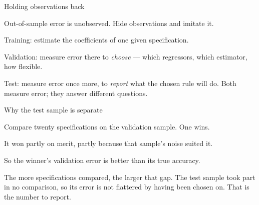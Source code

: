 \documentclass[aspectratio=169,11pt]{beamer}
\newenvironment{wideitemize}{\itemize\addtolength{\itemsep}{9pt}}{\enditemize}
\newcommand{\closingline}[1]{\vspace{0.9em}\noindent #1}
\begin{document}
\begin{frame}{Holding observations back}
\begin{center}
\end{center}
\vspace{0.3em}
\begin{wideitemize}
  \item Out-of-sample error is unobserved. Hide observations and imitate it.
  \item Training: estimate the coefficients of one given specification.
  \item Validation: measure error there to \emph{choose} --- which regressors,
        which estimator, how flexible.
  \item Test: measure error once more, to \emph{report} what the chosen rule
        will do.
\end{wideitemize}
\closingline{Both measure error; they answer different questions.}
\end{frame}

\begin{frame}{Why the test sample is separate}
\begin{wideitemize}
  \item Compare twenty specifications on the validation sample. One wins.
  \item It won partly on merit, partly because that sample's noise suited it.
  \item So the winner's validation error is better than its true accuracy.
  \item The more specifications compared, the larger that gap.
\end{wideitemize}
\closingline{The test sample took part in no comparison, so its error is not
flattered by having been chosen on. That is the number to report.}
\end{frame}
\end{document}
